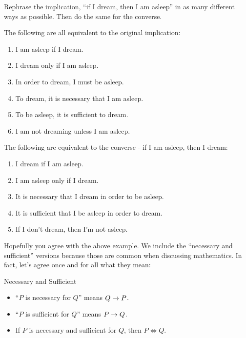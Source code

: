 \documentclass[12pt]{article}
\begin{document}
\begin{example}
 Rephrase the implication, ``if I dream, then I am asleep'' in as many different ways as possible.  Then do the same for the converse.
 
 \begin{solution}
  The following are all equivalent to the original implication:
  \begin{enumerate}
   \item I am asleep if I dream.
   \item I dream only if I am asleep.
   \item In order to dream, I must be asleep.
   \item To dream, it is necessary that I am asleep.
   \item To be asleep, it is sufficient to dream.
   \item I am not dreaming unless I am asleep.
  \end{enumerate}
The following are equivalent to the converse - if I am asleep, then I dream:
\begin{enumerate}
 \item I dream if I am asleep.
 \item I am asleep only if I dream.
 \item It is necessary that I dream in order to be asleep.
 \item It is sufficient that I be asleep in order to dream.
 \item If I don't dream, then I'm not asleep.
\end{enumerate}

 \end{solution}

\end{example}

Hopefully you agree with the above example.  We include the ``necessary and sufficient'' versions because those are common when discussing mathematics.  In fact, let's agree once and for all what they mean:


\begin{defbox}{Necessary and Sufficient}
\begin{itemize}
\item ``$P$ is necessary for $Q$'' means $Q \rightarrow P$.
 \item ``$P$ is sufficient for $Q$'' means $P \rightarrow Q$.
\item If $P$ is necessary and sufficient for $Q$, then $P \iff Q$.
\end{itemize}
\end{defbox}
\end{document}

